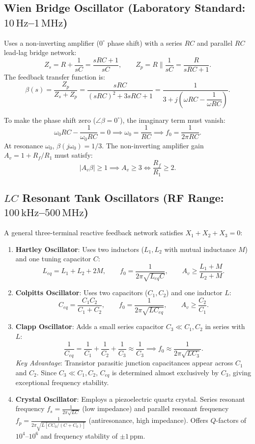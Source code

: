 \documentclass[12pt,a4paper]{article}
\begin{document}
\subsection{Wien Bridge Oscillator (Laboratory Standard: $10\,\mathrm{Hz}$--$1\,\mathrm{MHz}$)}
Uses a non-inverting amplifier ($0^\circ$ phase shift) with a series $RC$ and parallel $RC$ lead-lag bridge network:
\[
Z_s = R + \frac{1}{sC} = \frac{sRC + 1}{sC},\qquad
Z_p = R \parallel \frac{1}{sC} = \frac{R}{sRC + 1}.
\]
The feedback transfer function is:
\[
\beta(s) = \frac{Z_p}{Z_s + Z_p} = \frac{sRC}{(sRC)^2 + 3sRC + 1} = \frac{1}{3 + j\left(\omega RC - \dfrac{1}{\omega RC}\right)}.
\]

\begin{tcolorbox}[formulabox, title={Wien Bridge Oscillation Frequency and Gain Condition}]
To make the phase shift zero ($\angle \beta = 0^\circ$), the imaginary term must vanish:
\[
\omega_0 RC - \frac{1}{\omega_0 RC} = 0 \implies \omega_0 = \frac{1}{RC} \implies f_0 = \frac{1}{2\pi RC}.
\]
At resonance $\omega_0$, $\beta(j\omega_0) = 1/3$. The non-inverting amplifier gain $A_v = 1 + R_f/R_1$ must satisfy:
\[
|A_v \beta| \ge 1 \implies A_v \ge 3 \iff \frac{R_f}{R_1} \ge 2.
\]
\end{tcolorbox}

\subsection{$LC$ Resonant Tank Oscillators (RF Range: $100\,\mathrm{kHz}$--$500\,\mathrm{MHz}$)}
A general three-terminal reactive feedback network satisfies $X_1 + X_2 + X_3 = 0$:
\begin{enumerate}[leftmargin=1.5em, itemsep=3pt]
  \item \textbf{Hartley Oscillator}: Uses two inductors ($L_1, L_2$ with mutual inductance $M$) and one tuning capacitor $C$:
  \[
  L_{eq} = L_1 + L_2 + 2M,\qquad
  f_0 = \frac{1}{2\pi \sqrt{L_{eq} C}},\qquad
  A_v \ge \frac{L_1 + M}{L_2 + M}.
  \]
  \item \textbf{Colpitts Oscillator}: Uses two capacitors ($C_1, C_2$) and one inductor $L$:
  \[
  C_{eq} = \frac{C_1 C_2}{C_1 + C_2},\qquad
  f_0 = \frac{1}{2\pi \sqrt{L C_{eq}}},\qquad
  A_v \ge \frac{C_2}{C_1}.
  \]
  \item \textbf{Clapp Oscillator}: Adds a small series capacitor $C_3 \ll C_1, C_2$ in series with $L$:
  \[
  \frac{1}{C_{eq}} = \frac{1}{C_1} + \frac{1}{C_2} + \frac{1}{C_3} \approx \frac{1}{C_3} \implies f_0 \approx \frac{1}{2\pi \sqrt{L C_3}}.
  \]
  \textit{Key Advantage}: Transistor parasitic junction capacitances appear across $C_1$ and $C_2$. Since $C_3 \ll C_1, C_2$, $C_{eq}$ is determined almost exclusively by $C_3$, giving exceptional frequency stability.
  \item \textbf{Crystal Oscillator}: Employs a piezoelectric quartz crystal. Series resonant frequency $f_s = \frac{1}{2\pi\sqrt{L C}}$ (low impedance) and parallel resonant frequency $f_p = \frac{1}{2\pi\sqrt{L [C C_0/(C+C_0)]}}$ (antiresonance, high impedance). Offers $Q$-factors of $10^4$--$10^6$ and frequency stability of $\pm 1\,\mathrm{ppm}$.
\end{enumerate}
\end{document}
